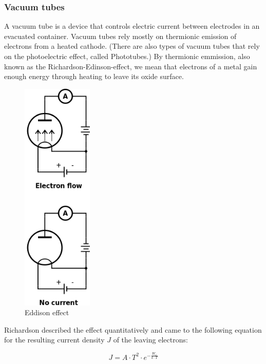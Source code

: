 \documentclass[11pt]{article}
\begin{document}
\subsubsection{Vacuum tubes}
A vacuum tube is a device that controls electric current between electrodes in an evacuated container. Vacuum tubes rely mostly on thermionic emission of electrons from a heated cathode. (There are also types of vacuum tubes that rely on the photoelectric effect, called Phototubes.) By thermionic emmission, also known as the Richardson-Edinson-effect, we mean that electrons of a metal gain enough energy through heating to leave its oxide surface. 
\begin{figure}[H]
\centering
\includegraphics[width=0.3\textwidth]{edisoneffect.png}%
\caption{Eddison effect}%
\label{fig:edison}
\end{figure}


Richardson described the effect quantitatively and came to the following equation for the resulting current density $J$ of the leaving electrons:

\begin{equation} 
\label{eq:J}
J=A\cdot T^2 \cdot e^{-\frac{W_e}{k \cdot T}}
\end{equation}
\end{document}
